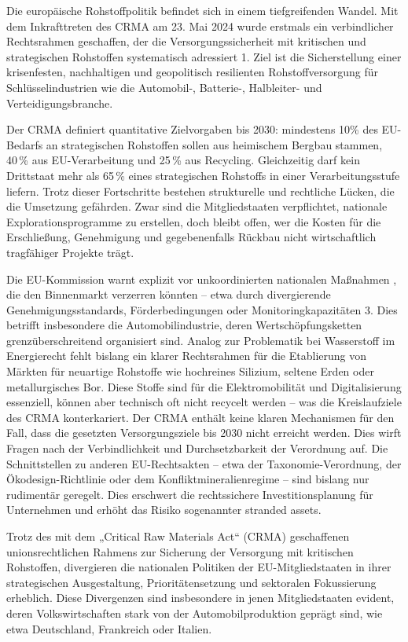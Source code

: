 \documentclass[12pt,a4paper,oneside]{book} %
\begin{document}
	Die europäische Rohstoffpolitik befindet sich in einem tiefgreifenden Wandel. Mit dem Inkrafttreten des CRMA am 23. Mai 2024 wurde erstmals ein verbindlicher Rechtsrahmen geschaffen, der die Versorgungssicherheit mit kritischen und strategischen Rohstoffen systematisch adressiert 1. Ziel ist die Sicherstellung einer krisenfesten, nachhaltigen und geopolitisch resilienten Rohstoffversorgung für Schlüsselindustrien wie die Automobil-, Batterie-, Halbleiter- und Verteidigungsbranche.
	
	Der CRMA definiert quantitative Zielvorgaben bis 2030: mindestens 10\% des EU-Bedarfs an strategischen Rohstoffen sollen aus heimischem Bergbau stammen, 40 \% aus EU-Verarbeitung und 25 \% aus Recycling. Gleichzeitig darf kein Drittstaat mehr als 65 \% eines strategischen Rohstoffs in einer Verarbeitungsstufe liefern. Trotz dieser Fortschritte bestehen strukturelle und rechtliche Lücken, die die Umsetzung gefährden. Zwar sind die Mitgliedstaaten verpflichtet, nationale Explorationsprogramme zu erstellen, doch bleibt offen, wer die Kosten für die Erschließung, Genehmigung und gegebenenfalls Rückbau nicht wirtschaftlich tragfähiger Projekte trägt.
	
	Die EU-Kommission warnt explizit vor \glqq unkoordinierten nationalen Maßnahmen \grqq, die den Binnenmarkt verzerren könnten – etwa durch divergierende Genehmigungsstandards, Förderbedingungen oder Monitoringkapazitäten 3. Dies betrifft insbesondere die Automobilindustrie, deren Wertschöpfungsketten grenzüberschreitend organisiert sind. Analog zur Problematik bei Wasserstoff im Energierecht fehlt bislang ein klarer Rechtsrahmen für die Etablierung von Märkten für neuartige Rohstoffe wie hochreines Silizium, seltene Erden oder metallurgisches Bor. Diese Stoffe sind für die Elektromobilität und Digitalisierung essenziell, können aber technisch oft nicht recycelt werden – was die Kreislaufziele des CRMA konterkariert. Der CRMA enthält keine klaren Mechanismen für den Fall, dass die gesetzten Versorgungsziele bis 2030 nicht erreicht werden. Dies wirft Fragen nach der Verbindlichkeit und Durchsetzbarkeit der Verordnung auf. Die Schnittstellen zu anderen EU-Rechtsakten – etwa der Taxonomie-Verordnung, der Ökodesign-Richtlinie oder dem Konfliktmineralienregime – sind bislang nur rudimentär geregelt. Dies erschwert die rechtssichere Investitionsplanung für Unternehmen und erhöht das Risiko sogenannter \glqq stranded assets\grqq.
	
Trotz des mit dem „Critical Raw Materials Act“ (CRMA) geschaffenen unionsrechtlichen Rahmens zur Sicherung der Versorgung mit kritischen Rohstoffen, divergieren die nationalen Politiken der EU-Mitgliedstaaten in ihrer strategischen Ausgestaltung, Prioritätensetzung und sektoralen Fokussierung erheblich. Diese Divergenzen sind insbesondere in jenen Mitgliedstaaten evident, deren Volkswirtschaften stark von der Automobilproduktion geprägt sind, wie etwa Deutschland, Frankreich oder Italien.
\end{document}
